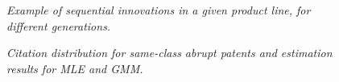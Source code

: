 \documentclass[letterpaper,12pt]{article}
\theoremstyle{definition}
\begin{document}
\begin{figure}[htb]\centering \captionsetup{width=5.8in}
    \caption{\label{fig:QLadder}\textit{Example of sequential innovations in a given product line, for different generations.}}
\end{figure}

\begin{figure}[htb]\centering \captionsetup{width=5.8in}
    \caption{\label{fig:GMM_MLE}\textit{Citation distribution for same-class abrupt patents and estimation results for MLE and GMM.}}
\end{figure}
\end{document}
